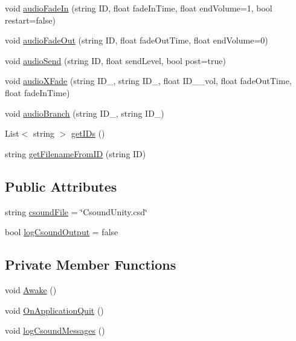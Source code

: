 \begin{DoxyCompactItemize}
\item 
void \hyperlink{class_csound_unity_a952d68f3432922a7a8d25724be0a4765}{audio\+Fade\+In} (string I\+D, float fade\+In\+Time, float end\+Volume=1, bool restart=false)
\item 
void \hyperlink{class_csound_unity_a175be60ec991b2d0f7cd021ebfe21aa2}{audio\+Fade\+Out} (string I\+D, float fade\+Out\+Time, float end\+Volume=0)
\item 
void \hyperlink{class_csound_unity_ac486217ea6c6d3676e0bb82d5330d924}{audio\+Send} (string I\+D, float send\+Level, bool post=true)
\item 
void \hyperlink{class_csound_unity_ad6922e2307a99215969ede166af0551b}{audio\+X\+Fade} (string I\+D\+\_, string I\+D\+\_, float I\+D\+\_\+\_\+vol, float fade\+Out\+Time, float fade\+In\+Time)
\item 
void \hyperlink{class_csound_unity_a91ce642f08df0b6612beed99120cf526}{audio\+Branch} (string I\+D\+\_, string I\+D\+\_)
\item 
List$<$ string $>$ \hyperlink{class_csound_unity_af3c884b51737a45ef70ea841d0d05843}{get\+I\+Ds} ()
\item 
string \hyperlink{class_csound_unity_a3e02f546264a98d51fd1f8cdb3fd462d}{get\+Filename\+From\+I\+D} (string I\+D)
\end{DoxyCompactItemize}
\subsection*{Public Attributes}
\begin{DoxyCompactItemize}
\item 
string \hyperlink{class_csound_unity_af1554e17f6554a2b17d0b25c1e477b4f}{csound\+File} = \char`\"{}Csound\+Unity.\+csd\char`\"{}
\item 
bool \hyperlink{class_csound_unity_a82c718d7b9393a4afb5d231e0bbef663}{log\+Csound\+Output} = false
\end{DoxyCompactItemize}
\subsection*{Private Member Functions}
\begin{DoxyCompactItemize}
\item 
void \hyperlink{class_csound_unity_af053c33dc16979fcf4cbaf4ebf435da4}{Awake} ()
\item 
void \hyperlink{class_csound_unity_a24c6bab026ac4366b8cb300c88e1b828}{On\+Application\+Quit} ()
\item 
void \hyperlink{class_csound_unity_aca5e8602587a1cbe53e0c78832572051}{log\+Csound\+Messages} ()
\end{DoxyCompactItemize}
